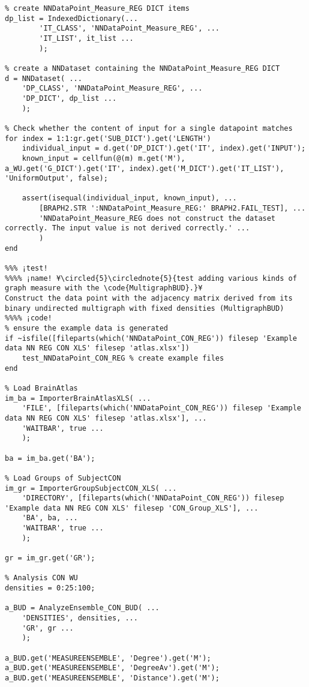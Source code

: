 \documentclass{tufte-handout}
\begin{document}
\begin{lstlisting}
% create NNDataPoint_Measure_REG DICT items
dp_list = IndexedDictionary(...
        'IT_CLASS', 'NNDataPoint_Measure_REG', ...
        'IT_LIST', it_list ...
        );

% create a NNDataset containing the NNDataPoint_Measure_REG DICT
d = NNDataset( ...
    'DP_CLASS', 'NNDataPoint_Measure_REG', ...
    'DP_DICT', dp_list ...
    );

% Check whether the content of input for a single datapoint matches
for index = 1:1:gr.get('SUB_DICT').get('LENGTH')
    individual_input = d.get('DP_DICT').get('IT', index).get('INPUT');
    known_input = cellfun(@(m) m.get('M'), a_WU.get('G_DICT').get('IT', index).get('M_DICT').get('IT_LIST'), 'UniformOutput', false);

    assert(isequal(individual_input, known_input), ...
        [BRAPH2.STR ':NNDataPoint_Measure_REG:' BRAPH2.FAIL_TEST], ...
        'NNDataPoint_Measure_REG does not construct the dataset correctly. The input value is not derived correctly.' ...
        )
end

%%% ¡test!
%%%% ¡name! ¥\circled{5}\circlednote{5}{test adding various kinds of graph measure with the \code{MultigraphBUD}.}¥
Construct the data point with the adjacency matrix derived from its binary undirected multigraph with fixed densities (MultigraphBUD)
%%%% ¡code!
% ensure the example data is generated
if ~isfile([fileparts(which('NNDataPoint_CON_REG')) filesep 'Example data NN REG CON XLS' filesep 'atlas.xlsx'])
    test_NNDataPoint_CON_REG % create example files
end

% Load BrainAtlas
im_ba = ImporterBrainAtlasXLS( ...
    'FILE', [fileparts(which('NNDataPoint_CON_REG')) filesep 'Example data NN REG CON XLS' filesep 'atlas.xlsx'], ...
    'WAITBAR', true ...
    );

ba = im_ba.get('BA');

% Load Groups of SubjectCON
im_gr = ImporterGroupSubjectCON_XLS( ...
    'DIRECTORY', [fileparts(which('NNDataPoint_CON_REG')) filesep 'Example data NN REG CON XLS' filesep 'CON_Group_XLS'], ...
    'BA', ba, ...
    'WAITBAR', true ...
    );

gr = im_gr.get('GR');

% Analysis CON WU
densities = 0:25:100;

a_BUD = AnalyzeEnsemble_CON_BUD( ...
    'DENSITIES', densities, ...
    'GR', gr ...
    );

a_BUD.get('MEASUREENSEMBLE', 'Degree').get('M');
a_BUD.get('MEASUREENSEMBLE', 'DegreeAv').get('M');
a_BUD.get('MEASUREENSEMBLE', 'Distance').get('M');


\end{lstlisting}
\end{document}
